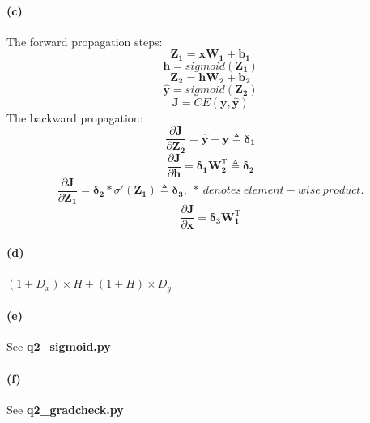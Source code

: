 \documentclass{article}
\begin{document}
\begin{spacing}{1.5}
\paragraph{(c)}
The forward propagation steps:
\begin{equation}
\boldsymbol{Z_{1}}=\boldsymbol{xW_{1}}+\boldsymbol{b_{1}}
\end{equation}
\begin{equation}
\boldsymbol{h}=sigmoid(\boldsymbol{Z_{1}})
\end{equation}
\begin{equation}
\boldsymbol{Z_{2}}=\boldsymbol{hW_{2}}+\boldsymbol{b_{2}}
\end{equation}
\begin{equation}
\boldsymbol{\widehat{y}}=sigmoid(\boldsymbol{Z_{2}})
\end{equation}
\begin{equation}
\boldsymbol{J}=CE(\boldsymbol{y}, \boldsymbol{\widehat{y}})
\end{equation}
The backward propagation: 
\begin{equation}
\frac{\partial \boldsymbol{J}}{\partial \boldsymbol{Z_2}}
=\boldsymbol{\widehat{y}}-\boldsymbol{y} \triangleq \boldsymbol{\delta_1}
\end{equation}
\begin{equation} 
\frac{\partial \boldsymbol{J}}{\partial \boldsymbol{h}}
=\boldsymbol{\delta_1} \boldsymbol{W_2 ^ \mathrm{T}} \triangleq \boldsymbol{\delta_2}
\end{equation}
\begin{equation}
\frac{\partial \boldsymbol{J}}{\partial \boldsymbol{Z_1}}
=\boldsymbol{\delta_2} \ast \sigma'(\boldsymbol{Z_1})\triangleq \boldsymbol{\delta_3}, \ \ast \ denotes \ element-wise \ product.
\end{equation} 
\begin{equation}
\frac{\partial \boldsymbol{J}}{\partial \boldsymbol{x}}
=\boldsymbol{\delta_3}\boldsymbol{W_1 ^ \mathrm{T}}
\end{equation}
\paragraph{(d)}
$ (1+D_x) \times H + (1+H) \times D_y $
\paragraph{(e)} See \textbf{q2\_sigmoid.py}
\paragraph{(f)} See \textbf{q2\_gradcheck.py}

\end{spacing}
\end{document}
